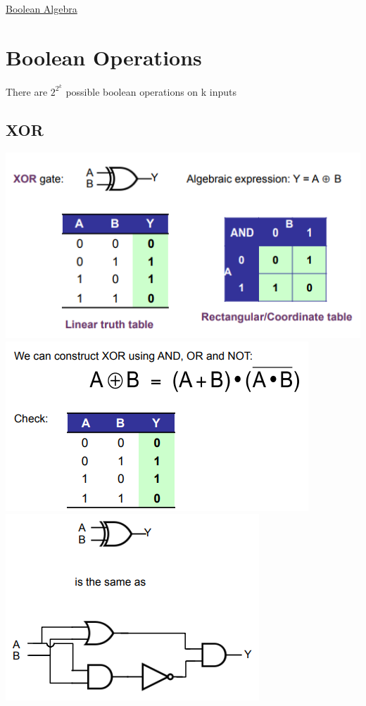 \documentclass{article}[18pt]
\begin{document}
\begin{center}
\underline{\huge Boolean Algebra}
\end{center}
\section{Boolean Operations}
There are $2^{2^k}$ possible boolean operations on k inputs
\subsection{XOR}
\includegraphics[scale=0.7]{XOR.png}\\
\includegraphics[scale=0.7]{XOR2.png}\\
\includegraphics[scale=0.7]{XOR3.png}
\end{document}
